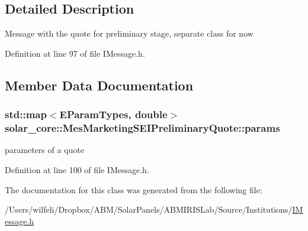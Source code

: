 \subsection{Detailed Description}
Message with the quote for preliminary stage, separate class for now 

Definition at line 97 of file I\+Message.\+h.



\subsection{Member Data Documentation}
\hypertarget{classsolar__core_1_1_mes_marketing_s_e_i_preliminary_quote_abe529e6fd227f28d2aab0c6df56e998d}{}
\subsubsection[{params}]{\setlength{\rightskip}{0pt plus 5cm}std\+::map$<${\bf E\+Param\+Types}, double$>$ solar\+\_\+core\+::\+Mes\+Marketing\+S\+E\+I\+Preliminary\+Quote\+::params}\label{classsolar__core_1_1_mes_marketing_s_e_i_preliminary_quote_abe529e6fd227f28d2aab0c6df56e998d}
parameters of a quote 

Definition at line 100 of file I\+Message.\+h.



The documentation for this class was generated from the following file\+:\begin{DoxyCompactItemize}
\item 
/\+Users/wilfeli/\+Dropbox/\+A\+B\+M/\+Solar\+Panels/\+A\+B\+M\+I\+R\+I\+S\+Lab/\+Source/\+Institutions/\hyperlink{_i_message_8h}{I\+Message.\+h}\end{DoxyCompactItemize}
